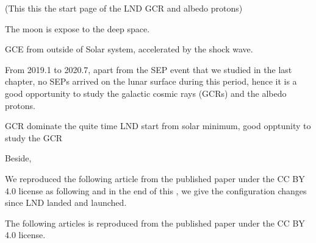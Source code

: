 (This this the start page of the LND GCR and albedo protons)


The moon is expose to the deep space. 


GCE from outside of Solar system, accelerated by the shock wave.


From 2019.1 to 2020.7, apart from the SEP event that we studied in the last chapter, no SEPs arrived on the lunar surface during this period, 
hence it is a good opportunity to study the galactic cosmic rays (GCRs) and the albedo protons.




GCR dominate the quite time
LND start from solar minimum, good opptunity to study the GCR

Beside,


We reproduced the following article from the published paper \citep{xu2020} under the CC BY 4.0 license as following and in the end of this , we give the configuration changes since LND landed and launched. 

The following articles is reproduced from the published paper \citep{xu2022} under the CC BY 4.0 license.







